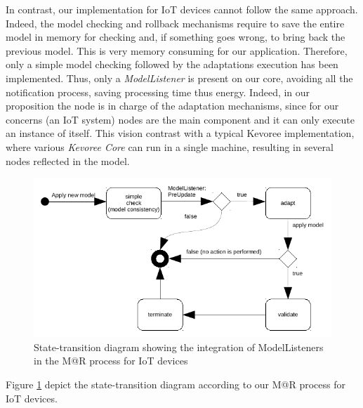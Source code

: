 In contrast, our implementation for IoT devices cannot follow the same approach.
Indeed, the model checking and rollback mechanisms require to save the entire model in memory for checking and, if something goes wrong, to bring back the previous model.
This is very memory consuming for our application.
Therefore, only a simple model checking followed by the adaptations execution has been implemented.
Thus, only a \textit{ModelListener} is present on our core, avoiding all the notification process, saving processing time thus energy.
Indeed, in our proposition the node is in charge of the adaptation mechanisms, since for our concerns (an IoT system) nodes are the main component and it can only execute an instance of itself.
This vision contrast with a typical Kevoree implementation, where various \textit{Kevoree Core} can run in a single machine, resulting in several nodes reflected in the model.



\begin{figure}[]
	\centering
	\includegraphics[width=0.85\columnwidth]{chapters/modelsAtRuntimeContiki.images/modelListenerIoT.pdf}
	\caption{State-transition diagram showing the integration of ModelListeners in the M@R process for IoT devices}
	\label{fig:MAR_modelListenerIoT}
\end{figure}

Figure \ref{fig:MAR_modelListenerIoT} depict the state-transition diagram according to our M@R process for IoT devices.

